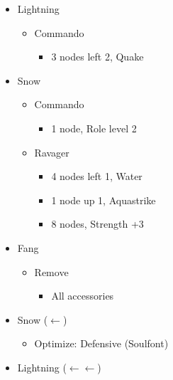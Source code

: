 \begin{multicols}{2}
\begin{menu}
\begin{itemize}
      \begin{itemize}
        \item Lightning
              \begin{itemize}
                \item Commando
                      \begin{itemize}
                        \item 3 nodes left 2, Quake
                      \end{itemize}
              \end{itemize}
        \item Snow
              \begin{itemize}
                \item Commando
                      \begin{itemize}
                        \item 1 node, Role level 2
                      \end{itemize}
                \item Ravager
                      \begin{itemize}
                        \item 4 nodes left 1, Water
                        \item 1 node up 1, Aquastrike
                        \item 8 nodes, Strength +3
                      \end{itemize}
              \end{itemize}
      \end{itemize}
      \equip
      \begin{itemize}
        \item Fang
              \begin{itemize}
                \item Remove
                      \begin{itemize}
                        \item All accessories
                      \end{itemize}
              \end{itemize}
        \item Snow ($\leftarrow$)
              \begin{itemize}
                \item Optimize: Defensive (Soulfont)
              \end{itemize}
        \item Lightning ($\leftarrow\leftarrow$)

\end{itemize}
\end{itemize}
\end{menu}
\end{multicols}
